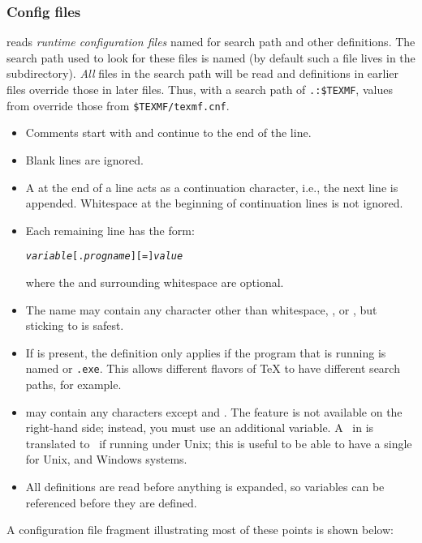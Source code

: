 \documentclass{article}
\begin{document}
\subsubsection{Config files}

\begingroup{}
\KPS{} reads \emph{runtime configuration files} named 
for search path and other definitions.  The search path used to look
for these files is named  (by default such a file lives
in the  subdirectory).  \emph{All}
 files in the search path will be read and definitions
in earlier files override those in later files.  Thus, with a search
path of \verb|.:$TEXMF|, values from  override those
from \verb|$TEXMF/texmf.cnf|.
\endgroup

\begin{itemize}
\item 
  Comments start with \code{\%} and continue to the end of the line.
\item 
  Blank lines are ignored.
\item
  A \bs{} at the end of a line acts as a continuation character,
  i.e., the next line is appended.  Whitespace at the beginning of
  continuation lines is not ignored.
\item 
  Each remaining line has the form:
\begin{alltt}
  \emph{variable}[.\emph{progname}] [=] \emph{value}
\end{alltt}%
  where the \samp{=} and surrounding whitespace are optional.
\item 
  The  name may contain any character other
  than whitespace, \samp{=}, or , but sticking to
   is safest.
\item 
  If  is present, the definition only
  applies if the program that is running is named
  \texttt{} or \texttt{.exe}.  This allows
  different flavors of \TeX{} to have different search paths, for
  example.
\item {} may contain any characters except
  \code{\%} and .  The
   feature is not available on the
  right-hand side; instead, you must use an additional variable.  A
  \samp{;}\ in  is translated to \samp{:}\ if
  running under Unix; this is useful to be able to have a single
   for Unix,  and Windows systems.
\item 
  All definitions are read before anything is expanded, so
  variables can be referenced before they are defined.
\end{itemize}
A configuration file fragment illustrating most of these points is
\ifSingleColumn
shown below:
\end{document}
